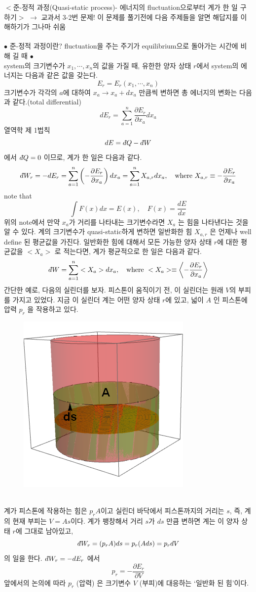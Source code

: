 \documentclass[a4paper,12pt]{article}
\newcommand{\dbar}{d\hspace*{-0.08em}\bar{}\hspace*{0.1em}}
\begin{document}
	\begin{flushleft}
		$<$준-정적 과정(Quasi-static process)- 에너지의 fluctuation으로부터 계가 한 일 구하기$>$ $\rightarrow$ 교과서 3-2번 문제! 이 문제를 풀기전에 다음 주제들을 알면 해답지를 이해하기가 그나마 쉬움 
	\end{flushleft}
\paragraph{}
$\bullet$ 준-정적 과정이란? fluctuation을 주는 주기가 equilibrium으로 돌아가는 시간에 비해 길 때 $\bullet$\\
system의 크기변수가 $x_1,\cdots,x_n$의 값을 가질 때, 유한한 양자 상태 $r$에서 system의 에너지는 다음과 같은 값을 갖는다.
$$E_r=E_r(x_1,\cdots,x_n)$$
크기변수가 각각의 $a$에 대하여 $x_a\rightarrow x_a+dx_a$ 만큼씩 변하면 총 에너지의 변화는 다음과 같다.(total differential)
$$dE_r=\sum_{a=1}^{n}\frac{\partial E_r}{\partial x_a}dx_a$$ 
열역학 제 1법칙
$$dE=\dbar Q-\dbar W$$
에서 $\dbar Q=0$ 이므로, 계가 한 일은 다음과 같다.
$$\dbar W_{r}=-dE_{r}=\sum_{a=1}^{n}\left( -\frac{\partial E_r}{\partial x_a}\right) dx_a=\sum_{a=1}^{n}X_{a,r}dx_a,\quad\mbox{where }X_{a,r}\equiv -\frac{\partial E_r}{\partial x_a}$$
note that 
$$\int F(x)dx=E(x), \quad F(x)=\frac{dE}{dx}$$
위의 note에서 만약 $x_a$가 거리를 나타내는 크기변수라면 $X_{a}$ 는 힘을 나타낸다는 것을 알 수 있다.  계의 크기변수가 quasi-static하게 변하면 일반화한 힘 $X_{a,r}$ 은 언제나 well define 된 평균값을 가진다. 일반화한 힘에 대해서 모든 가능한 양자 상태 $r$에 대한 평균값을 $<X_{a}>$ 로 적는다면, 계가 평균적으로 한 일은 다음과 같다.
$$\dbar W=\sum_{a=1}^{n}<X_{a}>dx_a, \quad \mbox{where }<X_a>\equiv \left\langle -\frac{\partial E_r}{\partial x_a} \right\rangle $$
간단한 예로, 다음의 실린더를 보자. 피스톤이 움직이기 전, 이 실린더는 원래 $V$의 부피를 가지고 있었다. 지금 이 실린더 계는 어떤 양자 상태 $r$에 있고, 넓이 $A$ 인 피스톤에 압력 $p_r$ 을 작용하고 있다.  
\begin{figure}[h]
	\centering
	\includegraphics[width=0.2\columnwidth]{cylinder.png}
	\end{figure}
\\계가 피스톤에 작용하는 힘은 $p_r A$이고 실린더 바닥에서 피스톤까지의 거리는 $s$, 즉, 계의 현재 부피는 $V=As$이다. 계가 팽창해서 거리 $s$가 $ds$ 만큼 변하면 계는 이 양자 상태 $r$에 그대로 남아있고,
$$\dbar W_{r}=(p_r A)ds=p_r(Ads)=p_r dV$$ 의 일을 한다. $\dbar W_r=-dE_r$ 에서 $$p_r=-\frac{\partial E_r}{\partial V}$$
앞에서의 논의에 따라 $p_r$ (압력) 은 크기변수 $V$ (부피)에 대응하는 `일반화 된 힘'이다.
\end{document}
